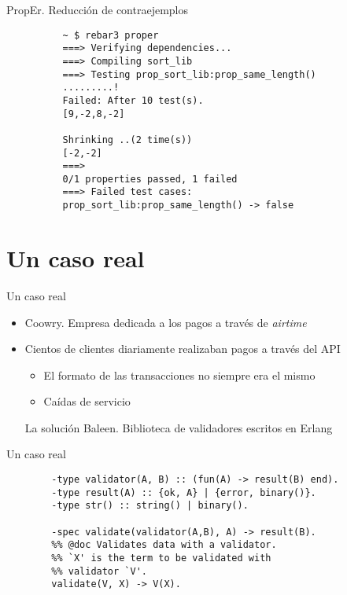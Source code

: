 \documentclass{beamer}
\begin{document}
      \begin{frame}[fragile]{PropEr. Reducción de contraejemplos}
        \begin{verbatim}
          ~ $ rebar3 proper
          ===> Verifying dependencies...
          ===> Compiling sort_lib
          ===> Testing prop_sort_lib:prop_same_length()
          .........!
          Failed: After 10 test(s).
          [9,-2,8,-2]

          Shrinking ..(2 time(s))
          [-2,-2]
          ===>
          0/1 properties passed, 1 failed
          ===> Failed test cases:
          prop_sort_lib:prop_same_length() -> false
        \end{verbatim}
      \end{frame}

  \section{Un caso real}
    \begin{frame}{Un caso real}
      \begin{itemize}
        \item Coowry. Empresa dedicada a los pagos a través de \textit{airtime}
        \item Cientos de clientes diariamente realizaban pagos a través del API
        \begin{itemize}
          \item El formato de las transacciones no siempre era el mismo
          \item Caídas de servicio
        \end{itemize}
        \pause
        \begin{exampleblock}{La solución}
          Baleen. Biblioteca de validadores escritos en Erlang
        \end{exampleblock}
      \end{itemize}
    \end{frame}

    \begin{frame}[fragile]{Un caso real}
      \begin{verbatim}
        -type validator(A, B) :: (fun(A) -> result(B) end).
        -type result(A) :: {ok, A} | {error, binary()}.
        -type str() :: string() | binary().

        -spec validate(validator(A,B), A) -> result(B).
        %% @doc Validates data with a validator.
        %% `X' is the term to be validated with
        %% validator `V'.
        validate(V, X) -> V(X).
      \end{verbatim}
    \end{frame}
\end{document}
